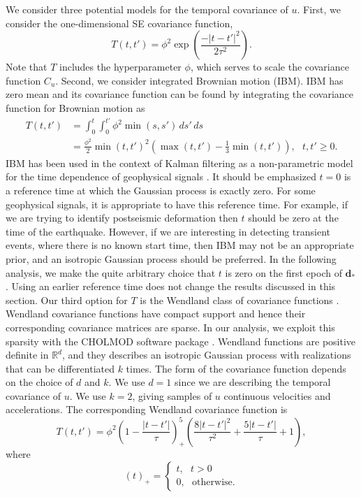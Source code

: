 We consider three potential models for the temporal covariance of $u$.
First, we consider the one-dimensional SE covariance function,
\begin{equation}\label{ch5:eq:TimeSE}
T(t,t') = \phi^2\exp\left(\frac{-|t - t'|^2}{2\tau^2}\right).
\end{equation}
Note that $T$ includes the hyperparameter $\phi$, which serves to
scale the covariance function $C_u$. Second, we consider integrated
Brownian motion (IBM). IBM has zero mean and its covariance function
can be found by integrating the covariance function for Brownian
motion as
\begin{align}\label{ch5:eq:IBM}
T(t,t') &= \int_0^t \int_0^{t'} \phi^2 \min(s,s') \,ds'\,ds \\
        &= \frac{\phi^2}{2}\min(t,t')^2 \left(\max(t,t') - \frac{1}{3}\min(t,t')\right), \ \ \ t,t' \geq 0.
\end{align}
IBM has been used in the context of Kalman filtering as a
non-parametric model for the time dependence of geophysical signals
\citep[e.g.,][]{Segall1997,McGuire2003,Ohtani2010,Hines2016a}. It
should be emphasized $t=0$ is a reference time at which the Gaussian
process is exactly zero. For some geophysical signals, it is
appropriate to have this reference time. For example, if we are trying
to identify postseismic deformation then $t$ should be zero at the
time of the earthquake.  However, if we are interesting in detecting
transient events, where there is no known start time, then IBM may not
be an appropriate prior, and an isotropic Gaussian process should be
preferred. In the following analysis, we make the quite arbitrary
choice that $t$ is zero on the first epoch of $\mathbf{d}_*$. Using an
earlier reference time does not change the results discussed in this
section. Our third option for $T$ is the Wendland class of covariance
functions \citep{Wendland2005}. Wendland covariance functions have
compact support and hence their corresponding covariance matrices are
sparse. In our analysis, we exploit this sparsity with the CHOLMOD
software package \citep{Chen2008}. Wendland functions are positive
definite in $\mathbb{R}^d$, and they describes an isotropic Gaussian
process with realizations that can be differentiated $k$ times. The
form of the covariance function depends on the choice of $d$ and $k$.
We use $d=1$ since we are describing the temporal covariance of $u$.
We use $k=2$, giving samples of $u$ continuous velocities and
accelerations. The corresponding Wendland covariance function is
\begin{equation}\label{ch5:eq:Wendland}
T(t,t') = \phi^2\left(1 - \frac{|t - t'|}{\tau}\right)^5_+ \left(\frac{8|t - t'|^2}{\tau^2} + \frac{5|t - t'|}{\tau} + 1\right), 
\end{equation}
where
\begin{equation}
(t)_+ = 
\begin{cases}
t, \ \ \ t > 0 \\
0, \ \ \ \mathrm{otherwise}.
\end{cases}
\end{equation}

